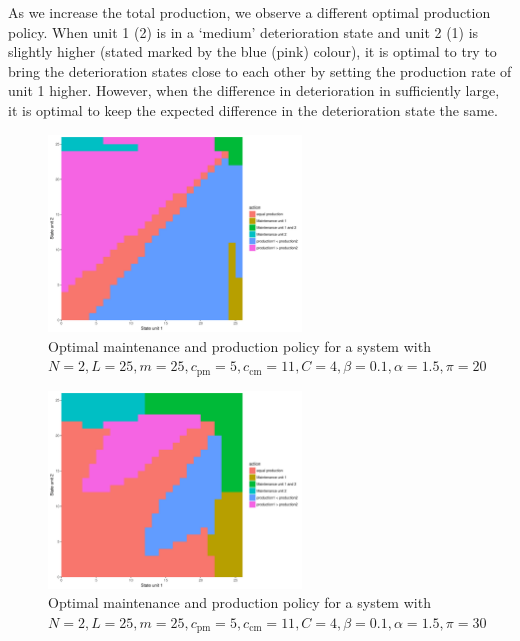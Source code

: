 \documentclass[a4paper,12pt]{article}
\begin{document}
As we increase the total production, we observe a different optimal production policy. When unit 1 (2) is in a `medium' deterioration state and unit 2 (1) is slightly higher (stated marked by the blue (pink) colour), it is optimal to try to bring the deterioration states close to each other by setting the production rate of unit 1 higher. However, when the difference in deterioration in sufficiently large, it is optimal to keep the expected difference in the deterioration state the same.
\begin{figure}[H] \label{main-prod-policy}
	\centering
	\includegraphics[width=0.6\textwidth]{figures/optimal_action_plot1}
	\caption{Optimal maintenance and production policy for a system with $N=2, L=25, m=25, c_\text{pm} = 5, c_\text{cm} = 11, C=4, \beta=0.1, \alpha=1.5, \pi=20$}
\end{figure}
\begin{figure}[H] \label{main-prod-policy2}
	\centering
	\includegraphics[width=0.6\textwidth]{figures/optimal_action_plot2}
	\caption{Optimal maintenance and production policy for a system with $N=2, L=25, m=25, c_\text{pm} = 5, c_\text{cm} = 11, C=4, \beta=0.1, \alpha=1.5, \pi=30$}
\end{figure}
\end{document}
